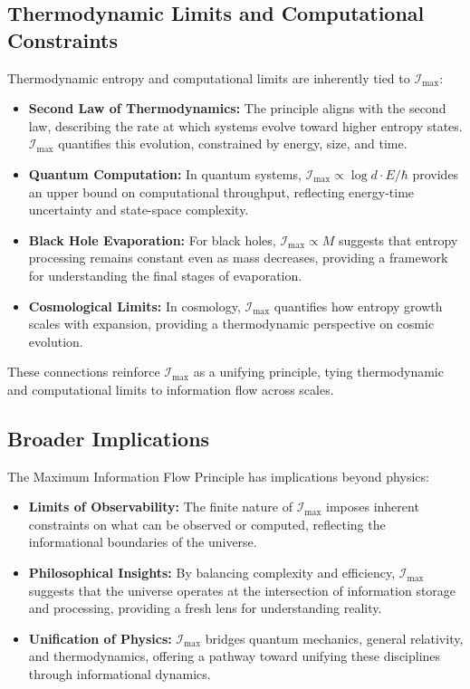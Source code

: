\documentclass[12pt]{article}
\begin{document}
\subsection{Thermodynamic Limits and Computational Constraints}
Thermodynamic entropy and computational limits are inherently tied to \( \mathcal{I}_{\text{max}} \):
\begin{itemize}
    \item \textbf{Second Law of Thermodynamics:} The principle aligns with the second law, describing the rate at which systems evolve toward higher entropy states. \( \mathcal{I}_{\text{max}} \) quantifies this evolution, constrained by energy, size, and time.
    \item \textbf{Quantum Computation:} In quantum systems, \( \mathcal{I}_{\text{max}} \propto \log d \cdot E / \hbar \) provides an upper bound on computational throughput, reflecting energy-time uncertainty and state-space complexity.
    \item \textbf{Black Hole Evaporation:} For black holes, \( \mathcal{I}_{\text{max}} \propto M \) suggests that entropy processing remains constant even as mass decreases, providing a framework for understanding the final stages of evaporation.
    \item \textbf{Cosmological Limits:} In cosmology, \( \mathcal{I}_{\text{max}} \) quantifies how entropy growth scales with expansion, providing a thermodynamic perspective on cosmic evolution.
\end{itemize}
These connections reinforce \( \mathcal{I}_{\text{max}} \) as a unifying principle, tying thermodynamic and computational limits to information flow across scales.

\subsection{Broader Implications}
The Maximum Information Flow Principle has implications beyond physics:
\begin{itemize}
    \item \textbf{Limits of Observability:} The finite nature of \( \mathcal{I}_{\text{max}} \) imposes inherent constraints on what can be observed or computed, reflecting the informational boundaries of the universe.
    \item \textbf{Philosophical Insights:} By balancing complexity and efficiency, \( \mathcal{I}_{\text{max}} \) suggests that the universe operates at the intersection of information storage and processing, providing a fresh lens for understanding reality.
    \item \textbf{Unification of Physics:} \( \mathcal{I}_{\text{max}} \) bridges quantum mechanics, general relativity, and thermodynamics, offering a pathway toward unifying these disciplines through informational dynamics.
\end{itemize}
\end{document}
